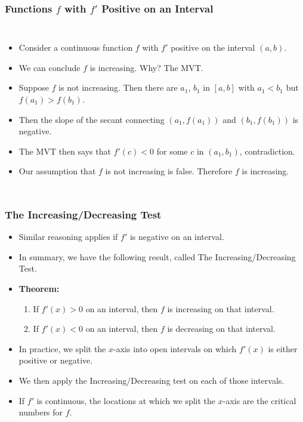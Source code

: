 \documentclass[serif,ignorenonframetext]{beamer}
\begin{document}
\begin{frame}
  \frametitle{Functions $f$ with $f'$ Positive on an Interval}
  \begin{columns}
  \begin{itemize}[<+->]
  \item Consider a continuous function $f$ with $f'$
    positive on the interval $(a,b)$.
  \item We can conclude $f$ is increasing.  Why?  The MVT.
  \item Suppose $f$ is not
    increasing.  Then there are $a_1$, $b_1$ in $[a,b]$ with $a_1<b_1$ but
    $f(a_1)>f(b_1)$.
  \item Then the slope of the secant connecting $(a_1,f(a_1))$ and
    $(b_1,f(b_1))$ is negative.
  \item The MVT then says that $f'(c)<0$ for some $c$ in $(a_1,b_1)$,
    contradiction.
  \item Our assumption that $f$ is not increasing is false.  Therefore
    $f$ is increasing.
  \end{itemize}
  \end{columns}
\end{frame}

\begin{frame}
  \frametitle{The Increasing/Decreasing Test}
  \begin{itemize}[<+->]
  \item Similar reasoning applies if $f'$ is negative on an interval.
  \item In summary, we have the following result, called The 
    Increasing/Decreasing Test.
  \item \textbf{Theorem:}
    \begin{enumerate}
    \item If $f'(x)>0$ on an interval, then $f$ is increasing on that
      interval.
    \item If $f'(x)<0$ on an interval, then $f$ is decreasing on that
      interval.
    \end{enumerate}
  \item In practice, we split the $x$-axis into open intervals on which
    $f'(x)$ is either positive or negative.
  \item We then apply the Increasing/Decreasing test on each of those
    intervals.
  \item If $f'$ is continuous,
    the locations at which we split the $x$-axis are the
    critical numbers for $f$.
  \end{itemize}
\end{frame}
\end{document}
